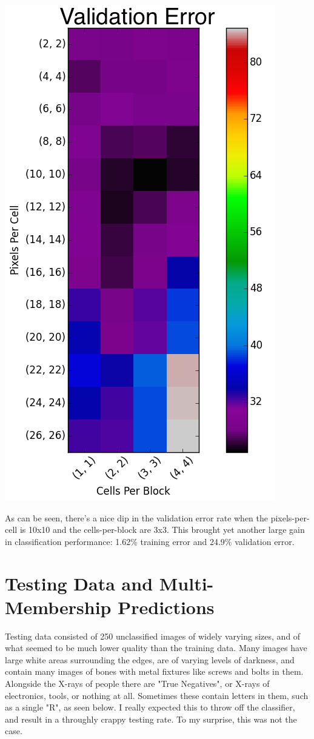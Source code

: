 \documentclass[12pt]{article}
\begin{document}
\includegraphics[scale=0.48]{../figures/val_hog_params.png}

As can be seen, there's a nice dip in the validation error rate when the pixels-per-cell
is 10x10 and the cells-per-block are 3x3. This brought yet another large gain in
classification performance: 1.62\% training error and 24.9\% validation error.

\section*{Testing Data and Multi-Membership Predictions}

Testing data consisted of 250 unclassified images of widely varying sizes,
and of what seemed to be much lower quality than the training data. Many
images have large white areas surrounding the edges, are of varying levels
of darkness, and contain many images of bones with metal fixtures like screws
and bolts in them. Alongside the X-rays of people there are "True Negatives", or
X-rays of electronics, tools, or nothing at all. Sometimes these contain letters
in them, such as a single "R", as seen below. I really expected this to throw off
the classifier, and result in a throughly crappy testing rate. To my surprise, this
was not the case.
\end{document}
